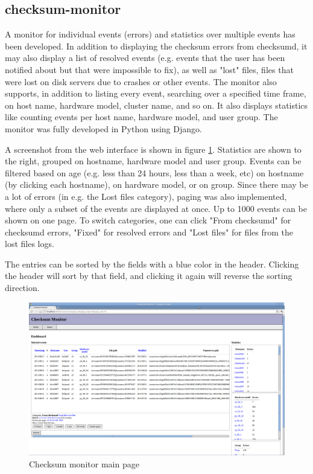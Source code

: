 \subsection{checksum-monitor}
A monitor for individual events (errors) and statistics over multiple events has been developed. In addition to displaying the checksum errors from checksumd, it may also display a list of resolved events (e.g. events that the user has been notified about but that were impossible to fix), as well as "lost" files, files that were lost on disk servers due to crashes or other events.  The monitor also supports, in addition to listing every event, searching over a specified time frame, on host name, hardware model, cluster name, and so on. It also displays statistics like counting events per host name, hardware model, and user group. The monitor was fully developed in Python using Django. 

A screenshot from the web interface is shown in figure \ref{fig:monitor-index}. Statistics are shown to the right, grouped on hostname, hardware model and user group. Events can be filtered based on age (e.g. less than 24 hours, less than a week, etc) on hostname (by clicking each hostname), on hardware model, or on group. Since there may be a lot of errors (in e.g. the Lost files category), paging was also implemented, where only a subset of the events are displayed at once. Up to 1000 events can be shown on one page. To switch categories, one can click "From checksumd" for checksumd errors, "Fixed" for resolved errors and "Lost files" for files from the lost files logs. 

The entries can be sorted by the fields with a blue color in the header. Clicking the header will sort by that field, and clicking it again will reverse the sorting direction. 

\begin{figure}[ht]
\centering
\includegraphics[width=\textwidth]{gfx/checksum-monitor-main}
\caption{Checksum monitor main page}
\label{fig:monitor-index}
\end{figure}


